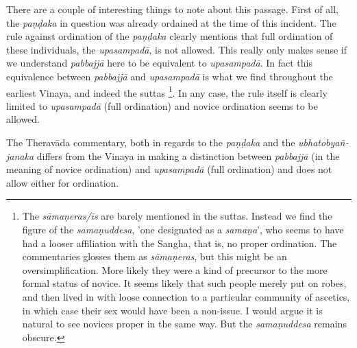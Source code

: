 There are a couple of interesting things to note about this passage. First of all, the {\em paṇḍaka} in question was already ordained at the time of this incident. The rule against ordination of the {\em paṇḍaka} clearly mentions that full ordination of these individuals, the {\em upasampadā}, is not allowed. This really only makes sense if we understand {\em pabbajjā} here to be equivalent to {\em upasampadā}. In fact this equivalence between {\em pabbajjā} and {\em upasampadā} is what we find throughout the earliest Vinaya, and indeed the suttas \footnote{The {\em sāmaṇeras/īs} are barely mentioned in the suttas. Instead we find the figure of the {\em samaṇuddesa}, 'one designated as a {\em samaṇa}', who seems to have had a looser affiliation with the Sangha, that is, no proper ordination. The commentaries glosses them as {\em sāmaṇeras}, but this might be an oversimplification. More likely they were a kind of precursor to the more formal status of novice. It seems likely that such people merely put on robes, and then lived in with loose connection to a particular community of ascetics, in which case their sex would have been a non-issue. I would argue it is natural to see novices proper in the same way. But the {\em samaṇuddesa} remains obscure.}. In any case, the rule itself is clearly limited to {\em upasampadā} (full ordination) and novice ordination seems to be allowed.

The Theravāda commentary, both in regards to the {\em paṇḍaka} and the {\em ubhatob­yañ­janaka} differs from the Vinaya in making a distinction between {\em pabbajjā} (in the meaning of novice ordination) and {\em upasampadā} (full ordination) and does not allow either for ordination.

